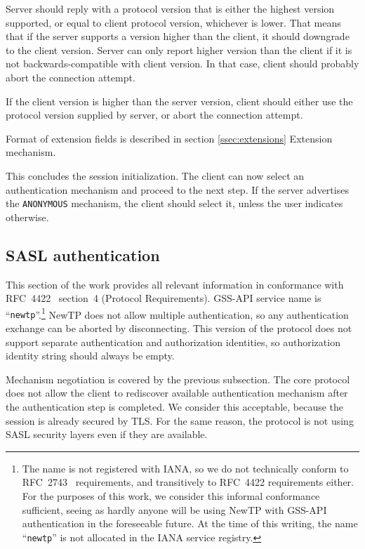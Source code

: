 Server should reply with a protocol version that is either the highest version supported, or equal to client
protocol version, whichever is lower. That means that if the server supports a version higher than the client,
it should downgrade to the client version. Server can only report higher version than the client if it is not
backwards-compatible with client version. In that case, client should probably abort the connection attempt.

If the client version is higher than the server version, client should either use the protocol version
supplied by server, or abort the connection attempt.

Format of extension fields is described in section \ref{ssec:extensions} Extension mechanism.

This concludes the session initialization. The client can now select an authentication mechanism and proceed
to the next step. If the server advertises the {\tt ANONYMOUS} mechanism, the client should select it, unless
the user indicates otherwise.

%

\subsection{SASL authentication}

This section of the work provides all relevant information in conformance with RFC~4422~\cite{rfc4422}
section~4 (Protocol Requirements). GSS-API service name is ``{\tt newtp}''.\footnote{The name is not
registered with IANA, so we do not technically conform to RFC~2743~\cite{rfc2743} requirements, and
transitively to RFC~4422 requirements either. For the purposes of this work, we consider this informal
conformance sufficient, seeing as hardly anyone will be using NewTP with GSS-API authentication in the
foreseeable future. At the time of this writing, the name ``{\tt newtp}'' is not allocated in the IANA service
registry.} NewTP does not allow multiple authentication, so any authentication exchange can be aborted by
disconnecting. This version of the protocol does not support separate authentication and authorization
identities, so authorization identity string should always be empty.

Mechanism negotiation is covered by the previous subsection. The core protocol does not allow the client to
rediscover available authentication mechanism after the authentication step is completed. We consider this
acceptable, because the session is already secured by TLS. For the same reason, the protocol is not using SASL
security layers even if they are available.

